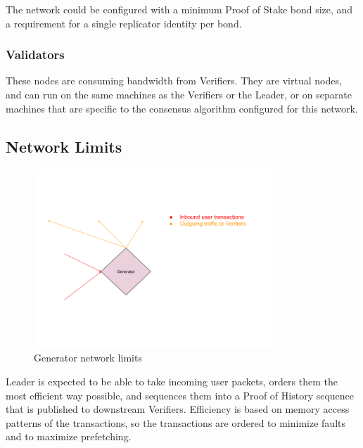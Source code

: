 \documentclass[12pt]{ltjsarticle}
\begin{document}
The network could be configured with a minimum Proof of Stake bond size, and a requirement for a single replicator identity per bond.
\subsubsection{Validators}
These nodes are consuming bandwidth from Verifiers. They are virtual nodes, and can run on the same machines as the Verifiers or the Leader, or on separate machines that are specific to the consensus algorithm configured for this network.

\subsection{Network Limits}

\begin{figure}
  \begin{center}
    \centering
    \includegraphics[width=0.8\textwidth]{../../figures/fig_10.png}
    \caption[Fig 10]{Generator network limits\label{fig_10}}
  \end{center}
  \end{figure}

Leader is expected to be able to take incoming user packets, orders them the most efficient way possible, and sequences them into a Proof of History sequence that is published to downstream Verifiers. Efficiency is based on memory access patterns of the transactions, so the transactions are ordered to minimize faults and to maximize prefetching.\\\\
\end{document}
